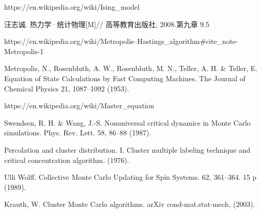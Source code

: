 \documentclass[12pt]{article} %
\begin{document}
\renewcommand\refname{参考文献}
\begin{thebibliography}{99}

        https://en.wikipedia.org/wiki/Ising\_model

        汪志诚. 热力学·统计物理[M]// 高等教育出版社, 2008.第九章 9.5

        https://en.wikipedia.org/wiki/Metropolis–Hastings\_algorithm\#cite\_note-Metropolis-1

        Metropolis, N., Rosenbluth, A. W., Rosenbluth, M. N., Teller, A. H. \& Teller, E. Equation of State Calculations by Fast Computing Machines. The Journal of Chemical Physics 21, 1087–1092 (1953).

        https://en.wikipedia.org/wiki/Master\_equation

        Swendsen, R. H. \& Wang, J.-S. Nonuniversal critical dynamics in Monte Carlo simulations. Phys. Rev. Lett. 58, 86–88 (1987).

        Percolation and cluster distribution. I. Cluster multiple labeling technique and critical concentration algorithm. (1976).

        Ulli Wolff. Collective Monte Carlo Updating for Spin Systems. 62, 361–364. 15 p (1989).

        Krauth, W. Cluster Monte Carlo algorithms. arXiv cond-mat.stat-mech, (2003).

\end{thebibliography}
\end{document}

